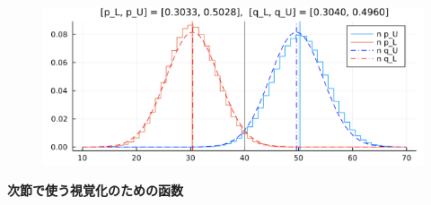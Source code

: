 \documentclass[
  letterpaper,
  DIV=11,
  numbers=noendperiod]{scrartcl}
\begin{document}
\begin{figure}[H]

{\centering \includegraphics{05 Central limit theorem_files/figure-pdf/cell-57-output-1.png}

}

\end{figure}

\textbf{次節で使う視覚化のための函数}
\end{document}
